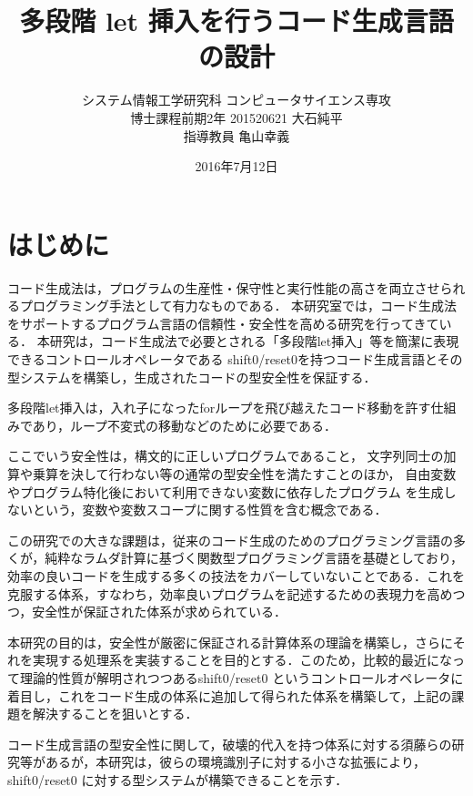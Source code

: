 \documentclass[10pt,a4j,twocolumn]{jarticle}
\title {\vspace{-2.0cm}多段階 let 挿入を行うコード生成言語の設計}
\date{2016年7月12日}
\author{システム情報工学研究科 コンピュータサイエンス専攻 \\
  博士課程前期2年 201520621 大石純平 \\
  指導教員 亀山幸義
}
\theoremstyle{definition}
\begin{document}
\maketitle
\section{はじめに}
コード生成法は，プログラムの生産性・保守性と実行性能の高さを両立させられるプログラミング手法として有力なものである．
本研究室では，コード生成法をサポートするプログラム言語の信頼性・安全性を高める研究を行ってきている．
本研究は，コード生成法で必要とされる「多段階let挿入」等を簡潔に表現できるコントロールオペレータである shift0/reset0を持つコード生成言語とその型システムを構築し，生成されたコードの型安全性を保証する．


多段階let挿入は，入れ子になったforループを飛び越えたコード移動を許す仕組みであり，ループ不変式の移動などのために必要である．

ここでいう安全性は，構文的に正しいプログラムであること，
文字列同士の加算や乗算を決して行わない等の通常の型安全性を満たすことのほか，
自由変数やプログラム特化後において利用できない変数に依存したプログラム
を生成しないという，変数や変数スコープに関する性質を含む概念である．

この研究での大きな課題は，従来のコード生成のためのプログラミング言語の多くが，純粋なラムダ計算に基づく関数型プログラミング言語を基礎としており，効率の良いコードを生成する多くの技法をカバーしていないことである．これを克服する体系，すなわち，効率良いプログラムを記述するための表現力を高めつつ，安全性が保証された体系が求められている．

本研究の目的は，安全性が厳密に保証される計算体系の理論を構築し，さらにそれを実現する処理系を実装することを目的とする．このため，比較的最近になって理論的性質が解明されつつあるshift0/reset0 というコントロールオペレータに着目し，これをコード生成の体系に追加して得られた体系を構築して，上記の課題を解決することを狙いとする．

コード生成言語の型安全性に関して，破壊的代入を持つ体系に対する須藤らの研究\cite{Sudo2014}等があるが，本研究は，彼らの環境識別子に対する小さな拡張により，shift0/reset0 に対する型システムが構築できることを示す．
\end{document}
